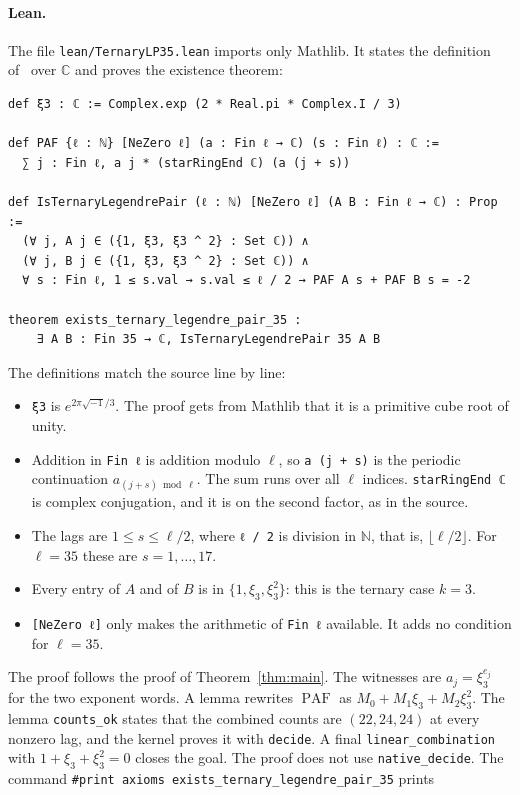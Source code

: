 \documentclass[11pt]{article}
\theoremstyle{remark}
\newcommand{\PAF}{\operatorname{PAF}}
\begin{document}
\paragraph{Lean.} The file \texttt{lean/TernaryLP35.lean} imports only Mathlib. It states the definition of~\cite{KLW} over $\mathbb{C}$ and proves the existence theorem:
\begin{Verbatim}[fontsize=\small]
def ξ3 : ℂ := Complex.exp (2 * Real.pi * Complex.I / 3)

def PAF {ℓ : ℕ} [NeZero ℓ] (a : Fin ℓ → ℂ) (s : Fin ℓ) : ℂ :=
  ∑ j : Fin ℓ, a j * (starRingEnd ℂ) (a (j + s))

def IsTernaryLegendrePair (ℓ : ℕ) [NeZero ℓ] (A B : Fin ℓ → ℂ) : Prop :=
  (∀ j, A j ∈ ({1, ξ3, ξ3 ^ 2} : Set ℂ)) ∧
  (∀ j, B j ∈ ({1, ξ3, ξ3 ^ 2} : Set ℂ)) ∧
  ∀ s : Fin ℓ, 1 ≤ s.val → s.val ≤ ℓ / 2 → PAF A s + PAF B s = -2

theorem exists_ternary_legendre_pair_35 :
    ∃ A B : Fin 35 → ℂ, IsTernaryLegendrePair 35 A B
\end{Verbatim}
The definitions match the source line by line:
\begin{itemize}
  \item \texttt{ξ3} is $e^{2\pi\sqrt{-1}/3}$. The proof gets from Mathlib that it is a primitive cube root of unity.
  \item Addition in \texttt{Fin ℓ} is addition modulo $\ell$, so \texttt{a (j + s)} is the periodic continuation $a_{(j+s) \bmod \ell}$. The sum runs over all $\ell$ indices. \texttt{starRingEnd ℂ} is complex conjugation, and it is on the second factor, as in the source.
  \item The lags are $1 \le s \le \ell / 2$, where \texttt{ℓ / 2} is division in $\mathbb{N}$, that is, $\lfloor \ell / 2 \rfloor$. For $\ell = 35$ these are $s = 1, \dots, 17$.
  \item Every entry of $A$ and of $B$ is in $\{1, \xi_3, \xi_3^2\}$: this is the ternary case $k = 3$.
  \item \texttt{[NeZero ℓ]} only makes the arithmetic of \texttt{Fin ℓ} available. It adds no condition for $\ell = 35$.
\end{itemize}
The proof follows the proof of Theorem~\ref{thm:main}. The witnesses are $a_j = \xi_3^{e_j}$ for the two exponent words. A lemma rewrites $\PAF$ as $M_0 + M_1 \xi_3 + M_2 \xi_3^2$. The lemma \texttt{counts\_ok} states that the combined counts are $(22, 24, 24)$ at every nonzero lag, and the kernel proves it with \texttt{decide}. A final \texttt{linear\_combination} with $1 + \xi_3 + \xi_3^2 = 0$ closes the goal. The proof does not use \texttt{native\_decide}. The command \texttt{\#print axioms exists\_ternary\_legendre\_pair\_35} prints
\end{document}
